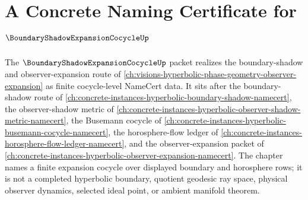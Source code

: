 \chapter{A Concrete Naming Certificate for $\BoundaryShadowExpansionCocycleUp$}
\label{ch:concrete-instances-boundary-shadow-expansion-cocycle-namecert}

The $\BoundaryShadowExpansionCocycleUp$ packet realizes the boundary-shadow and observer-expansion route of \autoref{ch:visions-hyperbolic-phase-geometry-observer-expansion} as finite cocycle-level NameCert data. It sits after the boundary-shadow route of \autoref{ch:concrete-instances-hyperbolic-boundary-shadow-namecert}, the observer-shadow metric of \autoref{ch:concrete-instances-hyperbolic-observer-shadow-metric-namecert}, the Busemann cocycle of \autoref{ch:concrete-instances-hyperbolic-busemann-cocycle-namecert}, the horosphere-flow ledger of \autoref{ch:concrete-instances-horosphere-flow-ledger-namecert}, and the observer-expansion packet of \autoref{ch:concrete-instances-hyperbolic-observer-expansion-namecert}. The chapter names a finite expansion cocycle over displayed boundary and horosphere rows; it is not a completed hyperbolic boundary, quotient geodesic ray space, physical observer dynamics, selected ideal point, or ambient manifold theorem.

